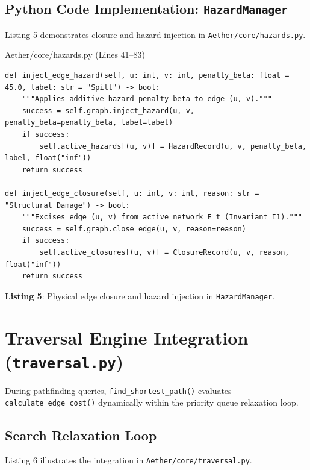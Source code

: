 \documentclass[10pt,a4paper]{article}
\begin{document}
\subsection{Python Code Implementation: \texttt{HazardManager}}
Listing 5 demonstrates closure and hazard injection in \texttt{Aether/core/hazards.py}.

\begin{codebox}{Aether/core/hazards.py (Lines 41--83)}
\begin{lstlisting}[style=AetherPython]
def inject_edge_hazard(self, u: int, v: int, penalty_beta: float = 45.0, label: str = "Spill") -> bool:
    """Applies additive hazard penalty beta to edge (u, v)."""
    success = self.graph.inject_hazard(u, v, penalty_beta=penalty_beta, label=label)
    if success:
        self.active_hazards[(u, v)] = HazardRecord(u, v, penalty_beta, label, float("inf"))
    return success

def inject_edge_closure(self, u: int, v: int, reason: str = "Structural Damage") -> bool:
    """Excises edge (u, v) from active network E_t (Invariant I1)."""
    success = self.graph.close_edge(u, v, reason=reason)
    if success:
        self.active_closures[(u, v)] = ClosureRecord(u, v, reason, float("inf"))
    return success
\end{lstlisting}
\end{codebox}
\vspace{-3pt}
\begin{center}\sffamily\footnotesize\textbf{Listing 5}: Physical edge closure and hazard injection in \texttt{HazardManager}.\end{center}

\newpage
\section{Traversal Engine Integration (\texttt{traversal.py})}

During pathfinding queries, \texttt{find\_shortest\_path()} evaluates \texttt{calculate\_edge\_cost()} dynamically within the priority queue relaxation loop.

\subsection{Search Relaxation Loop}
Listing 6 illustrates the integration in \texttt{Aether/core/traversal.py}.
\end{document}
